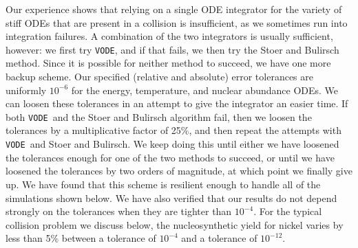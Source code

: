 \documentclass[twocolumn,numberedappendix]{../aastex62}
\newcommand{\vode}{\texttt{VODE}}
\begin{document}

Our experience shows that relying on a single ODE integrator for the
variety of stiff ODEs that are present in a collision is insufficient, as we
sometimes run into integration failures. A combination of the two integrators
is usually sufficient, however: we first try \vode, and if that fails, we then
try the Stoer and Bulirsch method. Since it is possible for neither method to
succeed, we have one more backup scheme. Our specified (relative and absolute)
error tolerances are uniformly $10^{-6}$ for the energy, temperature, and nuclear
abundance ODEs. We can loosen these tolerances in an attempt to give the integrator
an easier time. If both \vode\ and the Stoer and Bulirsch algorithm fail, then we
loosen the tolerances by a multiplicative factor of 25\%, and then repeat the attempts
with \vode\ and Stoer and Bulirsch. We keep doing this until either we have loosened
the tolerances enough for one of the two methods to succeed, or until we have loosened
the tolerances by two orders of magnitude, at which point we finally give up. We have
found that this scheme is resilient enough to handle all of the simulations shown below.
We have also verified that our results do not depend strongly on the tolerances when they
are tighter than $10^{-4}$. For the typical collision problem we discuss below, the
nucleosynthetic yield for nickel varies by less than 5\% between a tolerance of $10^{-4}$
and a tolerance of $10^{-12}$.


\end{document}
